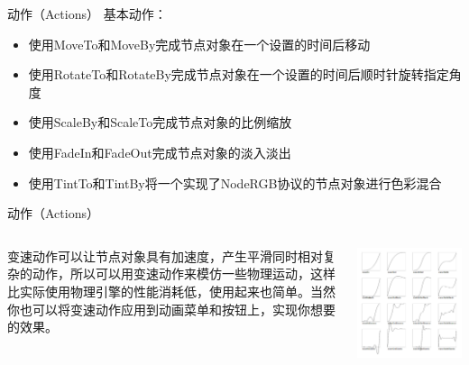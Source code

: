 \documentclass{beamer}
\begin{document}

\begin{frame}[fragile]{动作（Actions）}
基本动作：
\begin{itemize}
\item 使用MoveTo和MoveBy完成节点对象在一个设置的时间后移动
\item 使用RotateTo和RotateBy完成节点对象在一个设置的时间后顺时针旋转指定角度
\item 使用ScaleBy和ScaleTo完成节点对象的比例缩放
\item 使用FadeIn和FadeOut完成节点对象的淡入淡出
\item 使用TintTo和TintBy将一个实现了NodeRGB协议的节点对象进行色彩混合
\end{itemize}
\end{frame}


\begin{frame}[fragile]{动作（Actions）}
\begin{columns}
\begin{column}{0.6\textwidth}
变速动作可以让节点对象具有加速度，产生平滑同时相对复杂的动作，所以可以用变速动作来模仿一些物理运动，这样比实际使用物理引擎的性能消耗低，使用起来也简单。当然你也可以将变速动作应用到动画菜单和按钮上，实现你想要的效果。
\end{column}
\begin{column}{0.4\textwidth}
\includegraphics[width=\textwidth]
{figures/variable_speed_motion}
\end{column}
\end{columns}
\end{frame}
\end{document}
